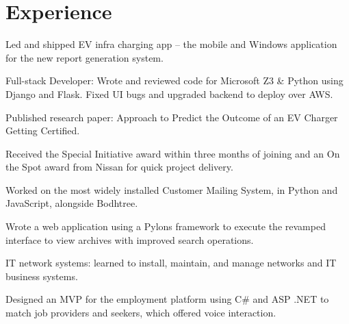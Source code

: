\documentclass[]{deedy-resume-openfont}
\begin{document}
\hfill
\begin{minipage}[t]{0.66\textwidth} 


\section{Experience}
\vspace{\topsep} %
\begin{tightemize}
\item Led and shipped EV infra charging app – the mobile and Windows application for the new report generation system.
\item Full-stack Developer:  Wrote and reviewed code for Microsoft Z3 & Python using Django and Flask. Fixed UI bugs and upgraded backend to deploy over AWS.
\item Published research paper: Approach to Predict the Outcome of an EV Charger Getting Certiﬁed.
\item Received the Special Initiative award within three months of joining and an  On the Spot award from Nissan for quick project delivery.
\end{tightemize}
\sectionsep

\begin{tightemize}
\item Worked on the most widely installed Customer Mailing System, in Python and JavaScript,  alongside Bodhtree.
\item Wrote a web application using a  Pylons framework to execute the revamped interface to view archives with improved search operations.
\end{tightemize}
\sectionsep

\begin{tightemize}
\item IT network systems: learned to install, maintain, and manage networks and IT business systems.
\item Designed an MVP for the employment platform using C# and ASP .NET to match job providers and seekers, which offered voice interaction.
\end{tightemize}
\sectionsep


\end{minipage}
\end{document}
